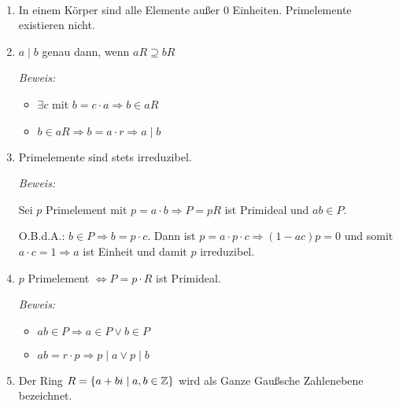 \begin{mylemma}\ \label{lem2.9}

    \begin{enumerate}
        \item In einem Körper sind alle Elemente außer $0$ Einheiten. Primelemente existieren nicht.
        \item $a \mid b$ genau dann, wenn $aR \supseteq bR$

            \textit{Beweis:}
            \begin{itemize}
                \item $\exists c$ mit $b = c \cdot a \Rightarrow b \in aR$
                \item $b \in aR \Rightarrow b = a \cdot r \Rightarrow a \mid b$
            \end{itemize}
        \item Primelemente sind stets irreduzibel.\label{lem2.9.3}

            \textit{Beweis:}

            Sei $p$ Primelement mit $p = a \cdot b \Rightarrow P = pR$ ist Primideal und $ab \in P.$

            O.B.d.A.: $b \in P \Rightarrow b = p \cdot c$. Dann ist $p = a \cdot p \cdot c \Rightarrow (1 - ac)p = 0$ und somit $a \cdot c = 1 \Rightarrow a$ ist Einheit und damit $p$ irreduzibel.
        \item $p$ Primelement $\Leftrightarrow P = p \cdot R$ ist Primideal.\label{lem2.9.4}

            \textit{Beweis:}
            \begin{itemize}
                \item $ab \in P \Rightarrow a \in P \vee b \in P$
                \item $ab = r \cdot p \Rightarrow p \mid a \vee p\mid b$
            \end{itemize}
        \item Der Ring $R = \{a + bi \mid a, b\in \mathbb{Z} \}$ wird als Ganze Gaußsche Zahlenebene bezeichnet.
    \end{enumerate}
\end{mylemma}


